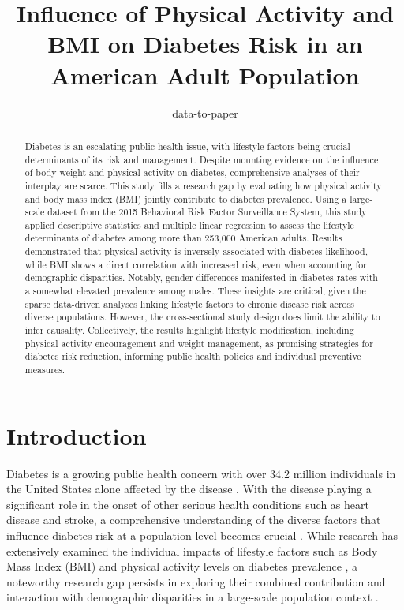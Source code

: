 \documentclass[11pt]{article}
\title{Influence of Physical Activity and BMI on Diabetes Risk in an American Adult Population}
\author{data-to-paper}
\begin{document}
\maketitle
\begin{abstract}
Diabetes is an escalating public health issue, with lifestyle factors being crucial determinants of its risk and management. Despite mounting evidence on the influence of body weight and physical activity on diabetes, comprehensive analyses of their interplay are scarce. This study fills a research gap by evaluating how physical activity and body mass index (BMI) jointly contribute to diabetes prevalence. Using a large-scale dataset from the 2015 Behavioral Risk Factor Surveillance System, this study applied descriptive statistics and multiple linear regression to assess the lifestyle determinants of diabetes among more than 253,000 American adults. Results demonstrated that physical activity is inversely associated with diabetes likelihood, while BMI shows a direct correlation with increased risk, even when accounting for demographic disparities. Notably, gender differences manifested in diabetes rates with a somewhat elevated prevalence among males. These insights are critical, given the sparse data-driven analyses linking lifestyle factors to chronic disease risk across diverse populations. However, the cross-sectional study design does limit the ability to infer causality. Collectively, the results highlight lifestyle modification, including physical activity encouragement and weight management, as promising strategies for diabetes risk reduction, informing public health policies and individual preventive measures.
\end{abstract}
\section*{Introduction}

Diabetes is a growing public health concern with over 34.2 million individuals in the United States alone affected by the disease \cite{Lam2012TheWD}. With the disease playing a significant role in the onset of other serious health conditions such as heart disease and stroke, a comprehensive understanding of the diverse factors that influence diabetes risk at a population level becomes crucial \cite{Bohn2015ImpactOP}. While research has extensively examined the individual impacts of lifestyle factors such as Body Mass Index (BMI) and physical activity levels on diabetes prevalence \cite{Chen2018AssociationOB, Kanaley2022ExercisePhysicalAI}, a noteworthy research gap persists in exploring their combined contribution and interaction with demographic disparities in a large-scale population context \cite{Hjerkind2017AdiposityPA,Boffetta2011BodyMI,Seiglie2020DiabetesPA}.
\end{document}

